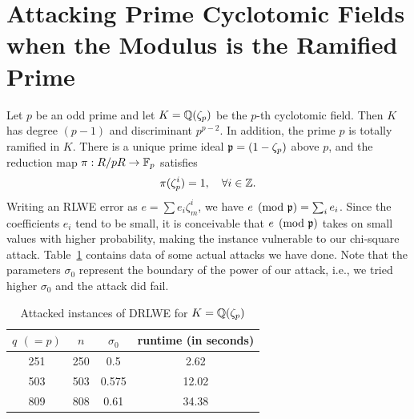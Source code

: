 \documentclass[envcountsame]{llncs}
\begin{document}
\section{Attacking Prime Cyclotomic Fields when the Modulus is the Ramified Prime}
\label{sec: ramified-prime}

Let $p$ be an odd prime and let $K = \mathbb{Q}(\zeta_p)$ be the $p$-th cyclotomic field. Then $K$ has degree $(p-1)$ and discriminant $p^{p-2}$. In addition, the prime $p$ is totally ramified in $K$. There is a unique prime ideal $\mathfrak{p} = (1 - \zeta_p)$ above $p$, and the reduction map  $\pi: R/pR \to \mathbb{F}_p$ satisfies
\[
        \pi(\zeta_p^i) = 1, \quad \forall i \in \mathbb{Z}.
\]
Writing an RLWE error as  $e = \sum e_i \zeta_m^i$, we have $e \pmod{\mathfrak{p}} = \sum_i e_i$. Since the coefficients $e_i$ tend to be small, it is conceivable that  $e \pmod{\mathfrak{p}}$ takes on small values with higher probability, making the instance vulnerable to our chi-square attack. Table~\ref{tab: ramified} contains data of some actual attacks we have done. Note that the parameters $\sigma_0$ represent the boundary of the power of our attack, i.e., we tried higher $\sigma_0$ and the attack did fail.

\begin{table}[H]
\begin{center}
\caption{Attacked instances of DRLWE for $K= \mathbb{Q}(\zeta_p)$}
\label{tab: ramified}
\begin{tabular}{c|c|c|c}
$q$ $( = p)$ & $n$ & $\sigma_0$ & runtime (in seconds) \\
\hline
251 & 250 &  0.5 & 2.62\\
503 &  503 & 0.575 & 12.02\\
809 & 808 & 0.61 & 34.38\\
\end{tabular}
\end{center}
\end{table}











\end{document}
